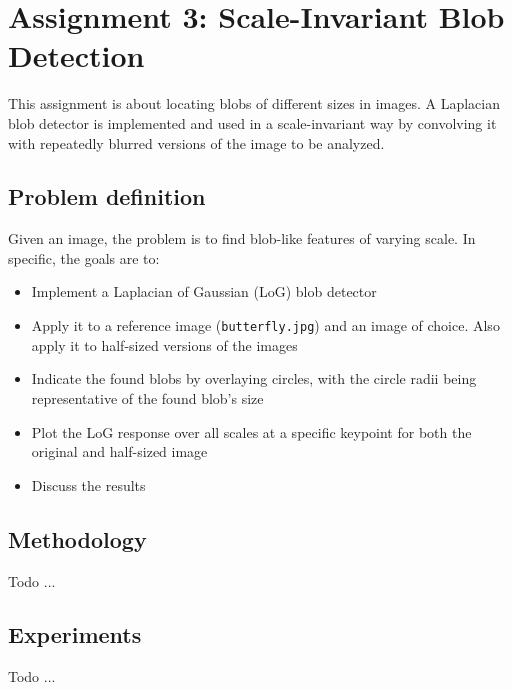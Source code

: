 \section{Assignment 3: Scale-Invariant Blob Detection}
\label{sec:assignment3}

This assignment is about locating blobs of different sizes in images. A Laplacian blob detector is implemented and used in a scale-invariant way by convolving it with repeatedly blurred versions of the image to be analyzed.

\subsection{Problem definition}

Given an image, the problem is to find blob-like features of varying scale. In specific, the goals are to:
\begin{itemize}[noitemsep]
\item Implement a Laplacian of Gaussian (LoG) blob detector
\item Apply it to a reference image (\texttt{butterfly.jpg}) and an image of choice. Also apply it to half-sized versions of the images
\item Indicate the found blobs by overlaying circles, with the circle radii being representative of the found blob's size
\item Plot the LoG response over all scales at a specific keypoint for both the original and half-sized image
\item Discuss the results
\end{itemize}

\subsection{Methodology}

Todo ...

\subsection{Experiments}

Todo ...

